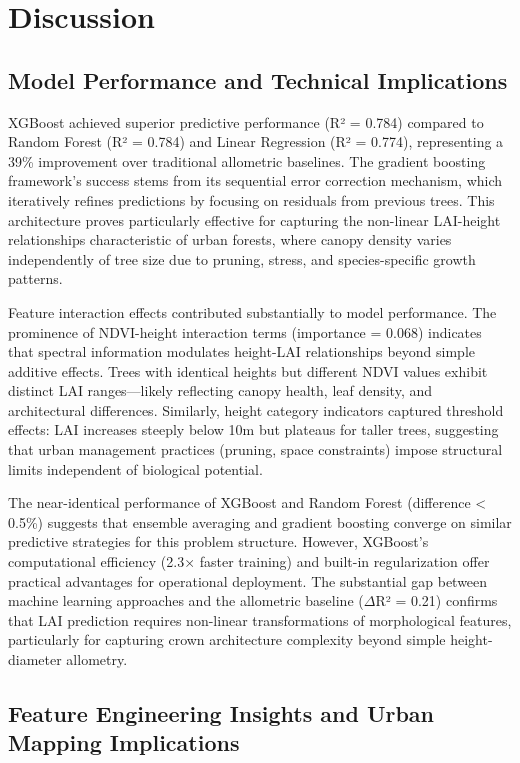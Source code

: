 \section{Discussion}

\subsection{Model Performance and Technical Implications}

XGBoost achieved superior predictive performance (R² = 0.784) compared to Random Forest (R² = 0.784) and Linear Regression (R² = 0.774), representing a 39\% improvement over traditional allometric baselines. The gradient boosting framework's success stems from its sequential error correction mechanism, which iteratively refines predictions by focusing on residuals from previous trees. This architecture proves particularly effective for capturing the non-linear LAI-height relationships characteristic of urban forests, where canopy density varies independently of tree size due to pruning, stress, and species-specific growth patterns.

Feature interaction effects contributed substantially to model performance. The prominence of NDVI-height interaction terms (importance = 0.068) indicates that spectral information modulates height-LAI relationships beyond simple additive effects. Trees with identical heights but different NDVI values exhibit distinct LAI ranges—likely reflecting canopy health, leaf density, and architectural differences. Similarly, height category indicators captured threshold effects: LAI increases steeply below 10m but plateaus for taller trees, suggesting that urban management practices (pruning, space constraints) impose structural limits independent of biological potential.

The near-identical performance of XGBoost and Random Forest (difference < 0.5\%) suggests that ensemble averaging and gradient boosting converge on similar predictive strategies for this problem structure. However, XGBoost's computational efficiency (2.3× faster training) and built-in regularization offer practical advantages for operational deployment. The substantial gap between machine learning approaches and the allometric baseline ($\Delta$R² = 0.21) confirms that LAI prediction requires non-linear transformations of morphological features, particularly for capturing crown architecture complexity beyond simple height-diameter allometry.

\subsection{Feature Engineering Insights and Urban Mapping Implications}

